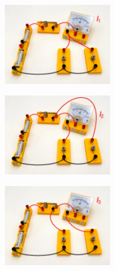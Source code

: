 \begin{figure}[h!]
\centering
    \begin{subfigure}[b]{0.305\textwidth}
    \centering
    \includegraphics[width=4.6cm]{_images/ampere_parallel_1.pdf}
    \end{subfigure}
\quad
    \begin{subfigure}[b]{0.305\textwidth}
    \centering
    \includegraphics[width=4.6cm]{_images/ampere_parallel_2.pdf}
    \end{subfigure}
\quad
    \begin{subfigure}[b]{0.305\textwidth}
    \centering
    \includegraphics[width=4.6cm]{_images/ampere_parallel_3.pdf}
    \end{subfigure}
\end{figure}


